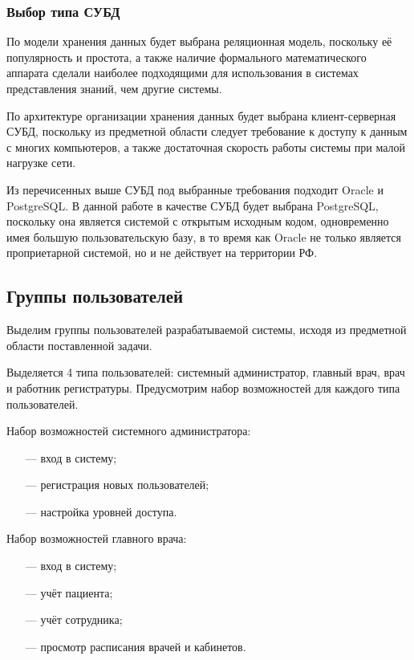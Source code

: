 \subsubsection{Выбор типа СУБД}

По модели хранения данных будет выбрана реляционная модель, поскольку её популярность и простота, а также наличие формального математического аппарата сделали наиболее подходящими для использования в системах представления знаний, чем другие системы.

По архитектуре организации хранения данных будет выбрана \newline клиент-серверная СУБД, поскольку из предметной области следует требование к доступу к данным с многих компьютеров, а также достаточная скорость работы системы при малой нагрузке сети.

Из перечисенных выше СУБД под выбранные требования подходит Oracle и PostgreSQL. 
В данной работе в качестве СУБД будет выбрана PostgreSQL, поскольку она является системой с открытым исходным кодом, одновременно имея большую пользовательскую базу, в то время как Oracle не только является проприетарной системой, но и не действует на территории РФ. 

\subsection{Группы пользователей}

Выделим группы пользователей разрабатываемой системы, исходя из предметной области поставленной задачи.

Выделяется 4 типа пользователей: системный администратор, главный врач, врач и работник регистратуры.
Предусмотрим набор возможностей для каждого типа пользователей.

Набор возможностей системного администратора:
\begin{itemize}[leftmargin=1.6\parindent]
	\item[---] вход в систему;
	\item[---] регистрация новых пользователей;
	\item[---] настройка уровней доступа.
\end{itemize}

Набор возможностей главного врача:
\begin{itemize}[leftmargin=1.6\parindent]
	\item[---] вход в систему;
	\item[---] учёт пациента;
	\item[---] учёт сотрудника;
	\item[---] просмотр расписания врачей и кабинетов.
\end{itemize}


